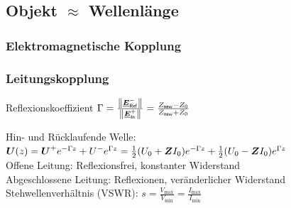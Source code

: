 \documentclass[fs, footer]{latex4ei}
\begin{document}
\begin{multicols*}{4}
{	\subsection{Objekt $\approx$ Wellenlänge}

		\subsubsection{Elektromagnetische Kopplung}
	
		\subsubsection{Leitungskopplung} 
		Reflexionskoeffizient $\Gamma = \frac{\left\|\underline{\boldsymbol {E}}^-_{\sf Ref}\right\|}{\left\|\underline{\boldsymbol {E}}^+_{\sf In}\right\|} = \frac{Z_{\sf new} - Z_0}{Z_{\sf new} + Z_0}$
	
	
		Hin- und Rücklaufende Welle: $\boldsymbol{U}(z) = \boldsymbol{U}^+ e^{-\Gamma z} + U^- e^{\Gamma z} = \frac12(U_0 + \boldsymbol{Z} I_0)e^{-\Gamma z} + \frac12 (U_0 - \boldsymbol{Z} I_0) e^{\Gamma z}  $\\
		Offene Leitung: Reflexionsfrei, konstanter Widerstand\\
		Abgeschlossene Leitung: Reflexionen, veränderlicher Widerstand\\
		Stehwellenverhältnis (VSWR): $s = \frac{V_{\max}}{V_{\min}} = \frac{I_{\max}}{I_{\min}}$\\
}

\end{multicols*}
\end{document}
